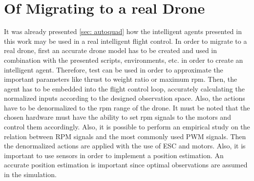 \newpage

\section{Of Migrating to a real Drone}
It was already presented \cref{sec: autoquad} how the intelligent agents presented in 
this work may be used in a real intelligent flight control.
In order to migrate to a real drone, first an accurate drone model has to be created
and used in combination with the presented scripts, environments, etc. in order to 
create an intelligent agent.
Therefore, test can be used in order to approximate the important parameters 
like thrust to weight ratio or maximum rpm.
Then, the agent has to be embedded into the flight control loop,
accurately calculating the normalized inputs according to the designed observation space.
Also, the actions have to be denormalized to the rpm range of the drone.
It must be noted that the chosen hardware must have the ability to set rpm signals 
to the motors and control them accordingly. Also, it is possible to perform an 
empirical study on the relation between RPM signals and the most commonly used
PWM signals.
Then the denormalized actions are applied with the use of ESC and motors.
Also, it is important to use sensors in order to implement a position estimation.
An accurate position estimation is important since optimal observations are assumed
in the simulation.

